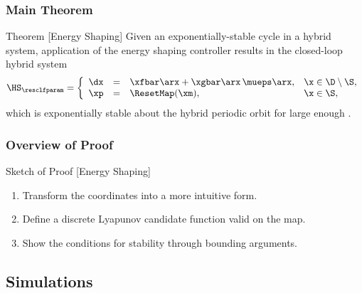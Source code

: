 \begin{frame}[t]
  \frametitle{Main Theorem}
  \begin{block}{Theorem [Energy Shaping]}
    Given an exponentially-stable cycle in a hybrid system, application
    of the energy shaping controller results in the closed-loop hybrid system
    \begin{align*}
      \HS_{\resclfparam} = \left\{
        \begin{array}{r c l l}
          \dx &=& \xfbar\arx + \xgbar\arx \, \mueps\arx, & \x \in \D \setminus \S,\\
          \xp &=& \ResetMap(\xm), & \x \in \S,
        \end{array}\right.
    \end{align*}
    which is exponentially stable about the hybrid periodic orbit \orbit for
    large enough \resclfparam.
  \end{block}
\end{frame}

\begin{frame}[t]
  \frametitle{Overview of Proof}
  \begin{block}{Sketch of Proof [Energy Shaping]}
    \begin{enumerate}
    \item Transform the coordinates into a more intuitive form.
    \item Define a discrete Lyapunov candidate function valid on the \Poincare map.
    \item Show the conditions for stability through bounding arguments.
    \end{enumerate}
  \end{block}
\end{frame}


\subsection{Simulations}

